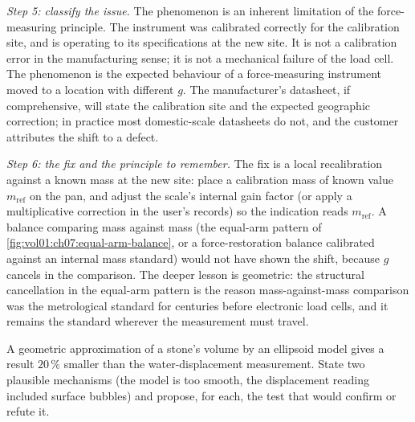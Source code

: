 \emph{Step 5: classify the issue.}
The phenomenon is an inherent limitation of the force-measuring
principle. The instrument was calibrated correctly for the
calibration site, and is operating to its specifications at the
new site. It is not a calibration error in the manufacturing
sense; it is not a mechanical failure of the load cell. The
phenomenon is the expected behaviour of a force-measuring
instrument moved to a location with different $g$. The
manufacturer's datasheet, if comprehensive, will state the
calibration site and the expected geographic correction; in
practice most domestic-scale datasheets do not, and the customer
attributes the shift to a defect.

\emph{Step 6: the fix and the principle to remember.}
The fix is a local recalibration against a known mass at the new
site: place a calibration mass of known value $m_{\mathrm{ref}}$
on the pan, and adjust the scale's internal gain factor (or apply
a multiplicative correction in the user's records) so the
indication reads $m_{\mathrm{ref}}$. A balance comparing mass
against mass (the equal-arm pattern of
\cref{fig:vol01:ch07:equal-arm-balance}, or a force-restoration
balance calibrated against an internal mass standard) would not
have shown the shift, because $g$ cancels in the comparison. The
deeper lesson is geometric: the structural cancellation in the
equal-arm pattern is the reason mass-against-mass comparison was
the metrological standard for centuries before electronic load
cells, and it remains the standard wherever the measurement must
travel.

\begin{exercise}
A geometric approximation of a stone's volume by an ellipsoid model
gives a result $20\,\%$ smaller than the water-displacement
measurement. State two plausible mechanisms (the model is too
smooth, the displacement reading included surface bubbles) and
propose, for each, the test that would confirm or refute it.
\end{exercise}

